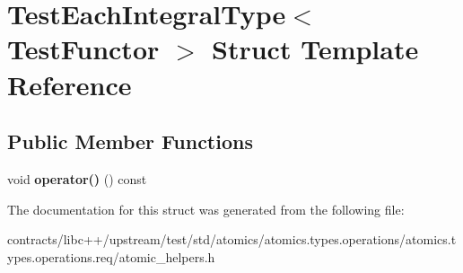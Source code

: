 \hypertarget{struct_test_each_integral_type}{}\section{Test\+Each\+Integral\+Type$<$ Test\+Functor $>$ Struct Template Reference}
\label{struct_test_each_integral_type}
\subsection*{Public Member Functions}
\begin{DoxyCompactItemize}
\item 
\mbox{\label{struct_test_each_integral_type_a4d68ab8626aa13a8c396e642483cc8cd}} 
void {\bfseries operator()} () const
\end{DoxyCompactItemize}


The documentation for this struct was generated from the following file\+:\begin{DoxyCompactItemize}
\item 
contracts/libc++/upstream/test/std/atomics/atomics.\+types.\+operations/atomics.\+types.\+operations.\+req/atomic\+\_\+helpers.\+h\end{DoxyCompactItemize}
